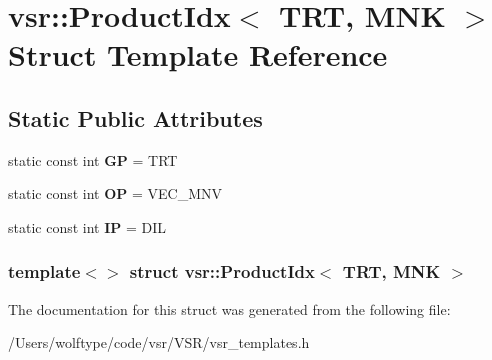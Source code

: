 \hypertarget{structvsr_1_1_product_idx_3_01_t_r_t_00_01_m_n_k_01_4}{\section{vsr\-:\-:Product\-Idx$<$ T\-R\-T, M\-N\-K $>$ Struct Template Reference}
\label{structvsr_1_1_product_idx_3_01_t_r_t_00_01_m_n_k_01_4}
}
\subsection*{Static Public Attributes}
\begin{DoxyCompactItemize}
\item 
\hypertarget{structvsr_1_1_product_idx_3_01_t_r_t_00_01_m_n_k_01_4_a8fe78553e8e6280442462eddfff8273a}{static const int {\bfseries G\-P} = T\-R\-T}\label{structvsr_1_1_product_idx_3_01_t_r_t_00_01_m_n_k_01_4_a8fe78553e8e6280442462eddfff8273a}

\item 
\hypertarget{structvsr_1_1_product_idx_3_01_t_r_t_00_01_m_n_k_01_4_aeb310363b37f1d699b8971bdcd197675}{static const int {\bfseries O\-P} = V\-E\-C\-\_\-\-M\-N\-V}\label{structvsr_1_1_product_idx_3_01_t_r_t_00_01_m_n_k_01_4_aeb310363b37f1d699b8971bdcd197675}

\item 
\hypertarget{structvsr_1_1_product_idx_3_01_t_r_t_00_01_m_n_k_01_4_a84c4881efaecd3fe529469cc38519420}{static const int {\bfseries I\-P} = D\-I\-L}\label{structvsr_1_1_product_idx_3_01_t_r_t_00_01_m_n_k_01_4_a84c4881efaecd3fe529469cc38519420}

\end{DoxyCompactItemize}
\subsubsection*{template$<$$>$ struct vsr\-::\-Product\-Idx$<$ T\-R\-T, M\-N\-K $>$}



The documentation for this struct was generated from the following file\-:\begin{DoxyCompactItemize}
\item 
/\-Users/wolftype/code/vsr/\-V\-S\-R/vsr\-\_\-templates.\-h\end{DoxyCompactItemize}
